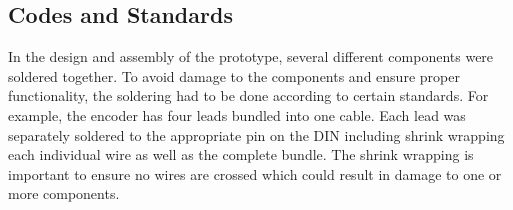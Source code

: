 \subsection*{Codes and Standards}
In the design and assembly of the prototype, several different components were soldered together. To avoid damage to the components and ensure proper functionality, the soldering had to be done according to certain standards. For example, the encoder has four leads bundled into one cable. Each lead was separately soldered to the appropriate pin on the DIN including shrink wrapping each individual wire as well as the complete bundle. The shrink wrapping is important to ensure no wires are crossed which could result in damage to one or more components. 